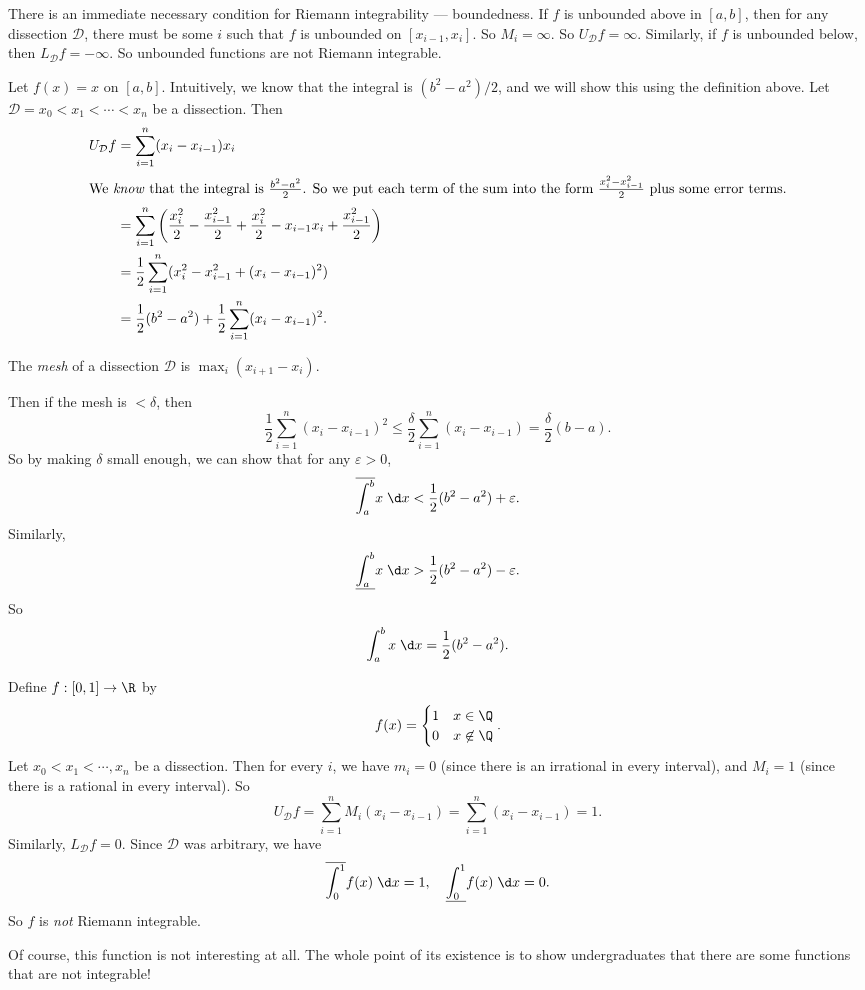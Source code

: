 \documentclass[a4paper]{article}
\begin{document}
There is an immediate necessary condition for Riemann integrability --- boundedness. If $f$ is unbounded above in $[a, b]$, then for any dissection $\mathcal{D}$, there must be some $i$ such that $f$ is unbounded on $[x_{i - 1}, x_i]$. So $M_i = \infty$. So $U_\mathcal{D} f = \infty$. Similarly, if $f$ is unbounded below, then $L_{\mathcal{D}} f = -\infty$. So unbounded functions are not Riemann integrable.

\begin{eg}
  Let $f(x) = x$ on $[a, b]$. Intuitively, we know that the integral is $(b^2 - a^2)/2$, and we will show this using the definition above. Let $\mathcal{D} = x_0 < x_1 < \cdots < x_n$ be a dissection. Then
  \begin{align*}
    U_{\mathcal{D}}f &= \sum_{i = 1}^n (x_i - x_{i - 1})x_i\\
    \intertext{We \emph{know} that the integral is $\frac{b^2 - a^2}{2}$. So we put each term of the sum into the form $\frac{x_i^2 - x_{i - 1}^2}{2}$ plus some error terms.}
    &= \sum_{i = 1}^n \left(\frac{x_i^2}{2} - \frac{x_{i - 1}^2}{2} + \frac{x_i^2}{2} - x_{i - 1}x_i + \frac{x_{i - 1}^2}{2}\right)\\
    &= \frac{1}{2}\sum_{i = 1}^n (x_i^2 - x_{i - 1}^2 + (x_i - x_{i - 1})^2)\\
    &= \frac{1}{2}(b^2 - a^2) + \frac{1}{2}\sum_{i = 1}^n(x_i - x_{i - 1})^2.
  \end{align*}
  \begin{defi}[Mesh]
    The \emph{mesh} of a dissection $\mathcal{D}$ is $\max_i (x_{i+1} - x_i)$.
  \end{defi}
  Then if the mesh is $ < \delta$, then
    \[
      \frac{1}{2}\sum_{i = 1}^n (x_i - x_{i - 1})^2 \leq \frac{\delta}{2}\sum_{i = 1}^n (x_i - x_{i - 1}) = \frac{\delta}{2}(b - a).
    \]
  So by making $\delta$ small enough, we can show that for any $\varepsilon > 0$,
  \[
    \overline{\int_a^b} x\;\d x < \frac{1}{2}(b^2 - a^2) + \varepsilon.
  \]
  Similarly,
  \[
    \underline{\int_a^b} x\;\d x > \frac{1}{2}(b^2 - a^2) - \varepsilon.
  \]
  So
  \[
    \int_a^b x\;\d x = \frac{1}{2}(b^2 - a^2).
  \]
\end{eg}

\begin{eg}
  Define $f: [0, 1] \to \R$ by
  \[
    f(x) =
    \begin{cases}
      1 & x \in \Q\\
      0 & x \not\in \Q
    \end{cases}.
  \]
  Let $x_0 < x_1 < \cdots, x_n$ be a dissection. Then for every $i$, we have $m_i = 0$ (since there is an irrational in every interval), and $M_i = 1$ (since there is a rational in every interval). So
  \[
    U_{\mathcal{D}}f = \sum_{i = 1}^nM_i(x_i - x_{i - 1}) = \sum_{i = 1}^n (x_i - x_{i - 1}) = 1.
  \]
  Similarly, $L_\mathcal{D} f = 0$. Since $\mathcal{D}$ was arbitrary, we have
  \[
    \overline{\int_0^1}f(x)\;\d x = 1, \quad \underline{\int_0^1}f(x)\;\d x = 0.
  \]
  So $f$ is \emph{not} Riemann integrable.

  Of course, this function is not interesting at all. The whole point of its existence is to show undergraduates that there are some functions that are not integrable!
\end{eg}
\end{document}
